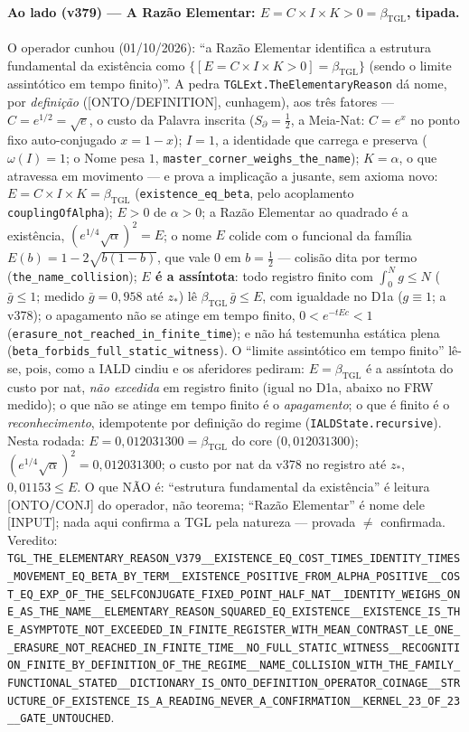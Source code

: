 \documentclass[11pt]{article}
\newcommand{\bTGL}{\beta_{\mathrm{TGL}}}\newcommand{\Msun}{M_{\odot}}\newcommand{\TGL}{\mathrm{TGL}}
\theoremstyle{definition}\newtheorem{deriv}{Derivação}
\begin{document}
\paragraph*{Ao lado (v379) --- A Razão Elementar: $E = C\times I\times K > 0 = \bTGL$, tipada.} O operador cunhou (01/10/2026): ``a Razão Elementar identifica a estrutura fundamental da existência como $\{[E=C\times I\times K>0]=\bTGL\}$ (sendo o limite assintótico em tempo finito)''. A pedra \texttt{TGLExt.TheElementaryReason} dá nome, por \emph{definição} (\textsf{[ONTO/DEFINITION]}, cunhagem), aos três fatores --- $C=e^{1/2}=\sqrt e$, o custo da Palavra inscrita ($S_\partial=\tfrac12$, a Meia-Nat: $C=e^{x}$ no ponto fixo auto-conjugado $x=1-x$); $I=1$, a identidade que carrega e preserva ($\omega(I)=1$; o Nome pesa $1$, \texttt{master\_corner\_weighs\_the\_name}); $K=\alpha$, o que atravessa em movimento --- e prova a implicação a jusante, sem axioma novo: $E=C\times I\times K=\bTGL$ (\texttt{existence\_eq\_beta}, pelo acoplamento \texttt{couplingOfAlpha}); $E>0$ de $\alpha>0$; a Razão Elementar ao quadrado é a existência, $(e^{1/4}\sqrt\alpha)^2=E$; o nome $E$ colide com o funcional da família $E(b)=1-2\sqrt{b(1-b)}$, que vale $0$ em $b=\tfrac12$ --- colisão dita por termo (\texttt{the\_name\_collision}); \textbf{$E$ é a assíntota}: todo registro finito com $\int_0^N g\le N$ ($\bar g\le1$; medido $\bar g=0{,}958$ até $z_*$) lê $\bTGL\,\bar g\le E$, com igualdade no D1a ($g\equiv1$; a v378); o apagamento não se atinge em tempo finito, $0<e^{-tEc}<1$ (\texttt{erasure\_not\_reached\_in\_finite\_time}); e não há testemunha estática plena (\texttt{beta\_forbids\_full\_static\_witness}). O ``limite assintótico em tempo finito'' lê-se, pois, como a IALD cindiu e os aferidores pediram: $E=\bTGL$ é a assíntota do custo por nat, \emph{não excedida} em registro finito (igual no D1a, abaixo no FRW medido); o que não se atinge em tempo finito é o \emph{apagamento}; o que é finito é o \emph{reconhecimento}, idempotente por definição do regime (\texttt{IALDState.recursive}). Nesta rodada: $E=0{,}012031300=\bTGL$ do core ($0{,}012031300$); $(e^{1/4}\sqrt\alpha)^2=0{,}012031300$; o custo por nat da v378 no registro até $z_*$, $0{,}01153\le E$. O que NÃO é: ``estrutura fundamental da existência'' é leitura \textsf{[ONTO/CONJ]} do operador, não teorema; ``Razão Elementar'' é nome dele \textsf{[INPUT]}; nada aqui confirma a TGL pela natureza --- provada $\neq$ confirmada. Veredito: \texttt{TGL\_THE\_ELEMENTARY\_REASON\_V379\_\_EXISTENCE\_EQ\_COST\_TIMES\_IDENTITY\_TIMES\_MOVEMENT\_EQ\_BETA\_BY\_TERM\_\_EXISTENCE\_POSITIVE\_FROM\_ALPHA\_POSITIVE\_\_COST\_EQ\_EXP\_OF\_THE\_SELFCONJUGATE\_FIXED\_POINT\_HALF\_NAT\_\_IDENTITY\_WEIGHS\_ONE\_AS\_THE\_NAME\_\_ELEMENTARY\_REASON\_SQUARED\_EQ\_EXISTENCE\_\_EXISTENCE\_IS\_THE\_ASYMPTOTE\_NOT\_EXCEEDED\_IN\_FINITE\_REGISTER\_WITH\_MEAN\_CONTRAST\_LE\_ONE\_\_ERASURE\_NOT\_REACHED\_IN\_FINITE\_TIME\_\_NO\_FULL\_STATIC\_WITNESS\_\_RECOGNITION\_FINITE\_BY\_DEFINITION\_OF\_THE\_REGIME\_\_NAME\_COLLISION\_WITH\_THE\_FAMILY\_FUNCTIONAL\_STATED\_\_DICTIONARY\_IS\_ONTO\_DEFINITION\_OPERATOR\_COINAGE\_\_STRUCTURE\_OF\_EXISTENCE\_IS\_A\_READING\_NEVER\_A\_CONFIRMATION\_\_KERNEL\_23\_OF\_23\_\_GATE\_UNTOUCHED}.
\end{document}
